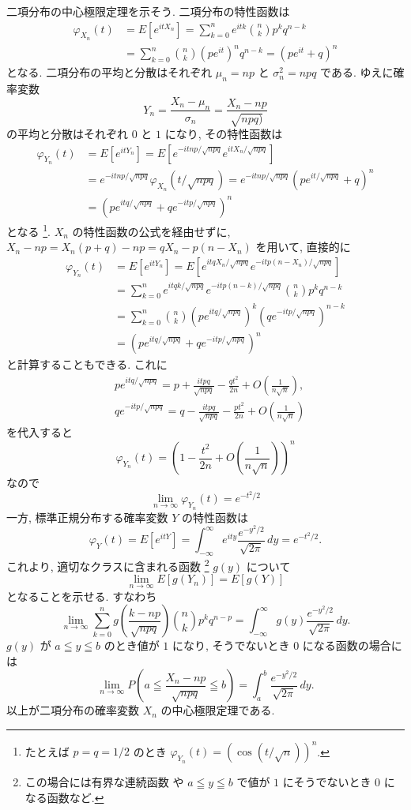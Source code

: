 \documentclass[12pt,twoside]{jarticle}
\theoremstyle{jplain}
\theoremstyle{jplain}
\theoremstyle{jplain}
\numberwithin{theorem}{section}
\numberwithin{equation}{section}
\numberwithin{figure}{section}
\numberwithin{table}{section}
\begin{document}
二項分布の中心極限定理を示そう.
二項分布の特性函数は
\begin{align*}
\varphi_{X_n}(t)
&=E[e^{itX_n}]
=\sum_{k=0}^n e^{itk}\binom{n}{k}p^kq^{n-k}
\\ &
=\sum_{k=0}^n \binom{n}{k}(pe^{it})^nq^{n-k}
=(pe^{it}+q)^n
\end{align*}
となる. 二項分布の平均と分散はそれぞれ $\mu_n=np$ と $\sigma_n^2=npq$
である. ゆえに確率変数
\[
Y_n=\frac{X_n-\mu_n}{\sigma_n}=\frac{X_n-np}{\sqrt{npq)}}
\]
の平均と分散はそれぞれ $0$ と $1$ になり, その特性函数は
\begin{align*}
\varphi_{Y_n}(t)
&
=E\left[e^{itY_n}\right]
=E\left[e^{-itnp/\sqrt{npq}}e^{itX_n/\sqrt{npq}}\right]
\\ &
=e^{-itnp/\sqrt{npq}}\varphi_{X_n}(t/\sqrt{npq})
=e^{-itnp/\sqrt{npq}}\left( pe^{it/\sqrt{npq}}+q \right)^n
\\ &
=\left( pe^{itq/\sqrt{npq}} + qe^{-itp/\sqrt{npq}} \right)^n
\end{align*}
となる%
\footnote{たとえば $p=q=1/2$ のとき $\varphi_{Y_n}(t)=\left( \cos(t/\sqrt{n}) \right)^n$.}. 
$X_n$ の特性函数の公式を経由せずに, 
$X_n-np=X_n(p+q)-np=qX_n-p(n-X_n)$ を用いて, 直接的に
\begin{align*}
\varphi_{Y_n}(t)
&
=E\left[e^{itY_n}\right]
=E\left[e^{itqX_n/\sqrt{npq}}e^{-itp(n-X_n)/\sqrt{npq}}\right]
\\ &
=\sum_{k=0}^n e^{itqk/\sqrt{npq}}e^{-itp(n-k)/\sqrt{npq}} \binom{n}{k}p^kq^{n-k}
\\ &
=\sum_{k=0}^n \binom{n}{k}
\left(pe^{itq/\sqrt{npq}}\right)^k \left(qe^{-itp/\sqrt{npq}}\right)^{n-k}
\\ &
=\left( pe^{itq/\sqrt{npq}} + qe^{-itp/\sqrt{npq}} \right)^n
\end{align*}
と計算することもできる. これに
\begin{align*}
&
pe^{itq/\sqrt{npq}}
= p + \frac{itpq}{\sqrt{npq}} - \frac{qt^2}{2n} + O\left(\frac{1}{n\sqrt{n}}\right),
\\ &
qe^{-itp/\sqrt{npq}}
= q - \frac{itpq}{\sqrt{npq}} - \frac{pt^2}{2n} + O\left(\frac{1}{n\sqrt{n}}\right)
\end{align*}
を代入すると
\[
\varphi_{Y_n}(t)=\left(1-\frac{t^2}{2n}+O\left(\frac{1}{n\sqrt{n}}\right)\right)^n
\]
なので
\[
\lim_{n\to\infty}\varphi_{Y_n}(t) = e^{-t^2/2}
\]
一方, 標準正規分布する確率変数 $Y$ の特性函数は
\[
\varphi_Y(t)
= E[e^{itY}]
= \int_{-\infty}^\infty e^{ity} \frac{e^{-y^2/2}}{\sqrt{2\pi}}\,dy
= e^{-t^2/2}.
\]
これより, 適切なクラスに含まれる函数%
\footnote{この場合には有界な連続函数
や $a\leqq y\leqq b$ で値が $1$ にそうでないとき $0$ になる函数など.} %
$g(y)$ について
\[
\lim_{n\to\infty} E[g(Y_n)] = E[g(Y)]
\]
となることを示せる. すなわち
\[
\lim_{n\to\infty}
\sum_{k=0}^n
g\left(\frac{k-np}{\sqrt{npq}}\right)
\binom{n}{k}p^k q^{n-p}
=
\int_{-\infty}^\infty g(y) \frac{e^{-y^2/2}}{\sqrt{2\pi}}\,dy.
\]
$g(y)$ が $a\leqq y\leqq b$ のとき値が $1$ になり, そうでないとき $0$ 
になる函数の場合には
\[
\lim_{n\to\infty}
P\left(a\leqq \frac{X_n-np}{\sqrt{npq}}\leqq b\right)
=
\int_a^b \frac{e^{-y^2/2}}{\sqrt{2\pi}}\,dy.
\]
以上が二項分布の確率変数 $X_n$ の中心極限定理である.
\end{document}
